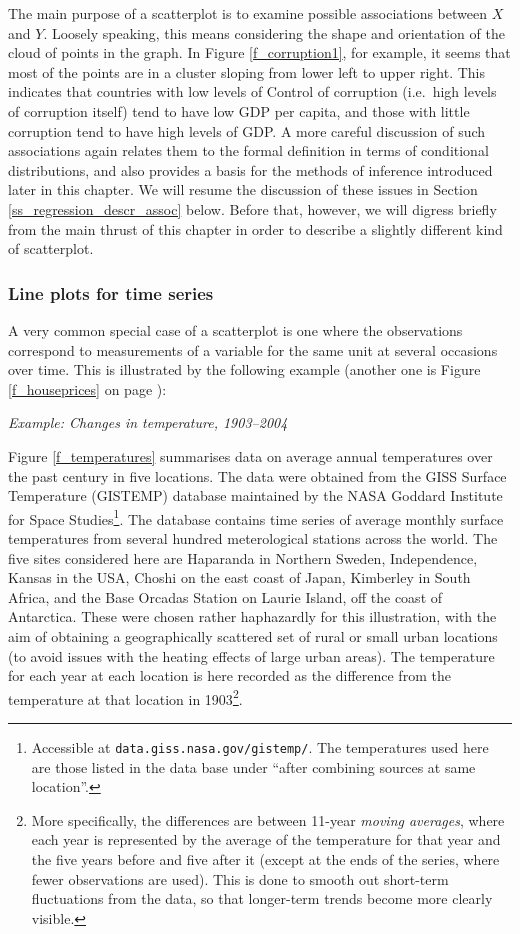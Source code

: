 The main purpose of a scatterplot is to examine possible associations
between $X$ and $Y$. Loosely speaking, this means considering the shape
and orientation of the cloud of points in the graph. In Figure
\ref{f_corruption1}, for example, it seems that most of the points are
in a cluster sloping from lower left to upper right. This indicates that
countries with low levels of Control of corruption (i.e.\ high levels of
corruption itself) tend to have low GDP per capita, and those with
little corruption tend to have high levels of GDP. A more careful
discussion of such associations again relates them to the formal definition
in terms of conditional distributions, and also provides a basis for the
methods of inference introduced later in this chapter. We will resume
the discussion of these issues in Section
\ref{ss_regression_descr_assoc} below. Before that, however, we will
digress briefly from the main thrust of this chapter in order to
describe a slightly different kind of scatterplot.

\subsubsection{Line plots for time series}

A very common special case of a scatterplot is
one where the observations correspond to measurements of a variable for
the same unit at several occasions over time. This is illustrated by the
following example (another one is Figure \ref{f_houseprices} on page
\pageref{f_houseprices}):

\emph{Example: Changes in temperature, 1903--2004}

Figure \ref{f_temperatures} summarises data on average annual
temperatures over the past century in five locations. The data were
obtained from the GISS Surface Temperature (GISTEMP) database maintained
by the NASA Goddard Institute for Space Studies\footnote{Accessible at
\texttt{data.giss.nasa.gov/gistemp/}. The temperatures used
here are those listed in the data base under ``after combining sources
at same location''.}. The database contains time series of average
monthly surface temperatures from several hundred meterological stations
across the world. The five sites considered here are Haparanda in
Northern Sweden, Independence, Kansas in the USA, Choshi on the east
coast of Japan, Kimberley in South Africa, and the Base Orcadas Station
on Laurie Island, off the coast of Antarctica. These were chosen rather
haphazardly for this illustration, with the aim of obtaining a
geographically scattered set of rural or small urban locations (to avoid
issues with the heating effects of large urban areas). The temperature
for each year at each location is here recorded as the difference from the
temperature at that location in 1903\footnote{More specifically, the differences
are between 11-year \emph{moving averages}, where each year is
represented by the average of the temperature for that year and the five
years before and five after it (except at the ends of the series, where
fewer observations are used). This is done to smooth out short-term
fluctuations from the data, so that longer-term trends become more
clearly visible.}.

